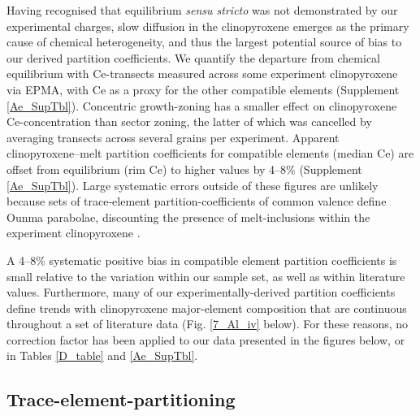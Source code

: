 \documentclass[review,authoryear,12pt]{elsarticle}
\begin{document}
Having recognised that equilibrium \emph{sensu stricto} was not demonstrated by our experimental charges, slow diffusion in the clinopyroxene emerges as the primary cause of chemical heterogeneity, and thus the largest potential source of bias to our derived partition coefficients.
	We quantify the departure from chemical equilibrium with Ce-transects measured across some experiment clinopyroxene via EPMA, with Ce as a proxy for the other compatible elements (Supplement \ref{Ae_SupTbl}). Concentric growth-zoning has a smaller effect on clinopyroxene Ce-concentration than sector zoning, the latter of which was cancelled by averaging transects across several grains per experiment.
		Apparent clinopyroxene--melt partition coefficients for compatible elements (median Ce) are offset from equilibrium (rim Ce) to higher values by 4--8\% (Supplement \ref{Ae_SupTbl}). Large systematic errors outside of these figures are unlikely because sets of trace-element partition-coefficients of common valence define Ounma parabolae, discounting the presence of melt-inclusions within the experiment clinopyroxene \citep[see Fig. \ref{8_Latticestrain3} below and][]{Kennedy1993}.

A 4--8\% systematic positive bias in compatible element partition coefficients is small relative to the variation within our sample set, as well as within literature values. Furthermore, many of our experimentally-derived partition coefficients define trends with clinopyroxene major-element composition that are continuous throughout a set of literature data (Fig. \ref{7_Al_iv} below). For these reasons, no correction factor has been applied to our data presented in the figures below, or in Tables \ref{D_table} and \ref{Ae_SupTbl}.


\subsection{Trace-element-partitioning}
\end{document}
